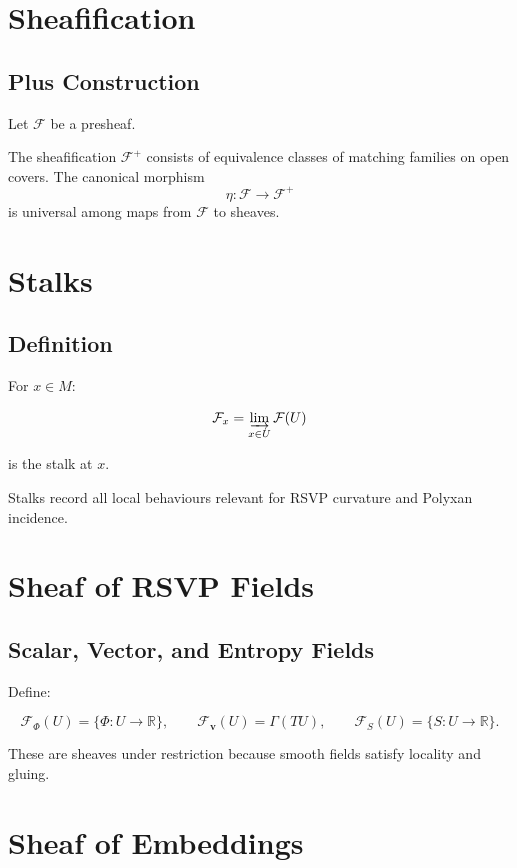 \section{Sheafification}

\subsection{Plus Construction}

Let $\mathcal{F}$ be a presheaf.

The sheafification $\mathcal{F}^+$ consists of equivalence classes of matching families on open covers.  
The canonical morphism  
\[
\eta : \mathcal{F} \to \mathcal{F}^+
\]
is universal among maps from $\mathcal{F}$ to sheaves.

\section{Stalks}

\subsection{Definition}

For $x\in M$:

\[
\mathcal{F}_x = \varinjlim_{x\in U} \mathcal{F}(U)
\]

is the stalk at $x$.

Stalks record all local behaviours relevant for RSVP curvature and Polyxan incidence.

\section{Sheaf of RSVP Fields}

\subsection{Scalar, Vector, and Entropy Fields}

Define:

\[
\mathcal{F}_\Phi(U) = \{ \Phi: U\to\mathbb{R} \},
\qquad
\mathcal{F}_{\mathbf{v}}(U) = \Gamma(TU),
\qquad
\mathcal{F}_S(U) = \{ S: U\to\mathbb{R} \}.
\]

These are sheaves under restriction because smooth fields satisfy locality and gluing.

\section{Sheaf of Embeddings}

